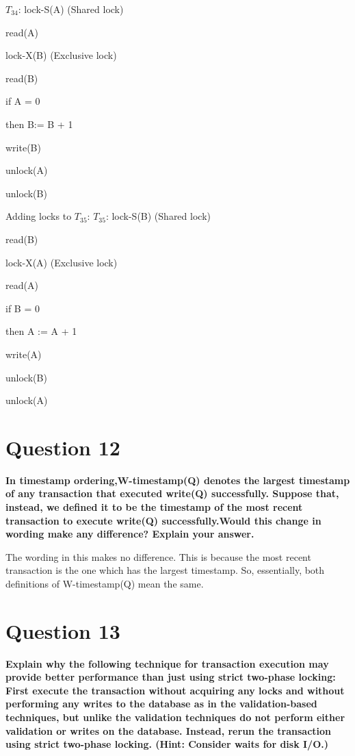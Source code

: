 \documentclass[12pt]{article}
\begin{document}
$T_{34}$: lock-S(A)   (Shared lock)

read(A)

lock-X(B)   (Exclusive lock)

read(B)

if A = 0

then B:= B + 1

write(B)

unlock(A)

unlock(B)
\bigskip

Adding locks to $T_{35}$:
$T_{35}$: lock-S(B)   (Shared lock)

read(B)

lock-X(A)   (Exclusive lock)

read(A)

if B = 0

then A := A + 1

write(A)

unlock(B)

unlock(A)

\section*{Question 12}
{\bfseries In timestamp ordering,W-timestamp(Q) denotes the largest timestamp of any transaction that executed write(Q) successfully. Suppose that, instead, we defined it to be the timestamp of the most recent transaction to execute write(Q) successfully.Would this change in wording make any difference? Explain your answer.}

The wording in this makes no difference. This is because the most recent transaction is the one which has the largest timestamp. So, essentially, both definitions of W-timestamp(Q) mean the same.

\section*{Question 13}
{\bfseries Explain why the following technique for transaction execution may provide better performance than just using strict two-phase locking: First execute the transaction without acquiring any locks and without performing any writes to the database as in the validation-based techniques, but unlike the validation
techniques do not perform either validation or writes on the database. Instead, rerun the transaction using strict two-phase locking. (Hint: Consider waits for disk I/O.)}
\end{document}
